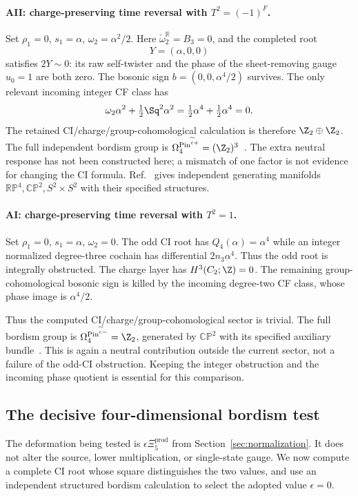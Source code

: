 \paragraph{AII: charge-preserving time reversal with $T^2=(-1)^F$.}
Set ${\rho_1}=0$, ${s_1}=\alpha$, $\omega_2=\alpha^2/2$. Here $\check\omega_2^{\mathbb R}=B_3=0$, and the completed root
\begin{equation}
                         Y=(\alpha,0,0)
\end{equation}
satisfies $2Y\sim0$: its raw self-twister and the phase of the sheet-removing gauge $u_0=1$ are both zero. The bosonic sign $b=(0,0,\alpha^4/2)$ survives. The only relevant incoming integer CF class has
\begin{equation}
       \omega_2\alpha^2+\tfrac12\Sq^2\alpha^2
                      =\tfrac12\alpha^4+\tfrac12\alpha^4=0.
\end{equation}
The retained CI/charge/group-cohomological calculation is therefore $\Z_2\oplus\Z_2$. The full independent bordism group is
$\Omega_4^{\operatorname{Pin}^{\widetilde c+}}=(\Z_2)^3$~\cite{FreedHopkins}. The extra neutral response has not been constructed here; a mismatch of one factor is not evidence for changing the CI formula. Ref.~\cite[Proposition~6.27]{DebrayYeYu} gives independent generating manifolds $\mathbb{RP}^4,\mathbb{CP}^2,S^2\times S^2$ with their specified structures.

\paragraph{AI: charge-preserving time reversal with $T^2=1$.}
Set ${\rho_1}=0$, ${s_1}=\alpha$, $\omega_2=0$. The odd CI root has $Q_4(\alpha)=\alpha^4$ while an integer normalized degree-three cochain has differential $2n_3\alpha^4$. Thus the odd root is integrally obstructed. The charge layer has $H^3(C_2;\Z)=0$. The remaining group-cohomological bosonic sign is killed by the incoming degree-two CF class, whose phase image is $\alpha^4/2$.

Thus the computed CI/charge/group-cohomological sector is trivial. The full bordism group is $\Omega_4^{\operatorname{Pin}^{\widetilde c-}}=\Z_2$, generated by $\mathbb{CP}^2$ with its specified auxiliary bundle~\cite{FreedHopkins,DebrayYeYu}. This is again a neutral contribution outside the current sector, not a failure of the odd-CI obstruction. Keeping the integer obstruction and the incoming phase quotient is essential for this comparison.

\subsection{The decisive four-dimensional bordism test}\label{subsec:decisive-bordism}\label{sec:bordism06}
The deformation being tested is $\epsilon\Xi_5^{\mathrm{prod}}$ from Section~\ref{sec:normalization}. It does not alter the source, lower multiplication, or single-state gauge. We now compute a complete CI root whose square distinguishes the two values, and use an independent structured bordism calculation to select the adopted value $\epsilon=0$.
